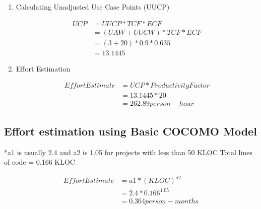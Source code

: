 \begin{enumerate}
\item {Calculating Unadjusted Use Case Points (UUCP)}

\begin{align}
    UCP     &= UUCP * TCF * ECF \\
            &= (UAW + UUCW) * TCF * ECF \\
            &= (3 + 20) * 0.9 * 0.635 \\
            &= 13.1445
\end{align}


\item {Effort Estimation}

\begin{align}
    Effort Estimate     &= UCP * Productivity Factor \\
                        &= 13.1445 * 20 \\
                        &= 262.89 person-hour
\end{align}

\end{enumerate}

\subsection{Effort estimation using Basic COCOMO Model}

*a1 is usually 2.4 and a2 is 1.05 for projects with less than 50 KLOC
Total lines of code = 0.166 KLOC

\begin{align}
    Effort Estimate     &= a1 * (KLOC)^{a2}\\
                        &= 2.4 * 0.166^{1.05} \\
                        &= 0.364 person-months
\end{align}

